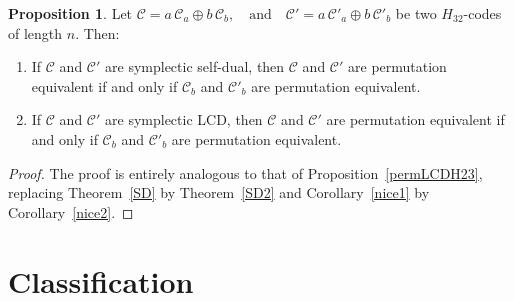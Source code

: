 \documentclass[11pt,a4paper]{article}
\theoremstyle{definition}
\newtheorem{proposition}[theorem]{Proposition}
\numberwithin{equation}{section}
\newcommand{\F}{\mathbb{F}}
\def\C{{\mathcal{C}}}
\begin{document}
\begin{proposition}\label{permLCDH32}
Let $\C = a\,\C_a\oplus b\,\C_b, \quad\text{and}\quad
\C' = a\,\C'_a\oplus b\,\C'_b$ 
be two \(H_{32}\)-codes of length \(n\).  Then:
\begin{enumerate}
  \item If \(\C\) and \(\C'\) are symplectic self-dual, then \(\C\) and \(\C'\) are permutation equivalent if and only if \(\C_b\) and \(\C'_b\) are permutation equivalent.
  \item If \(\C\) and \(\C'\) are symplectic LCD, then \(\C\) and \(\C'\) are permutation equivalent if and only if \(\C_b\) and \(\C'_b\) are permutation equivalent.
\end{enumerate}
\end{proposition}

\begin{proof}
The proof is entirely analogous to that of Proposition~\ref{permLCDH23}, replacing Theorem~\ref{SD} by Theorem~\ref{SD2} and Corollary~\ref{nice1} by Corollary~\ref{nice2}.
\end{proof}
\section{Classification  }\label{Hclass}


\end{document}
